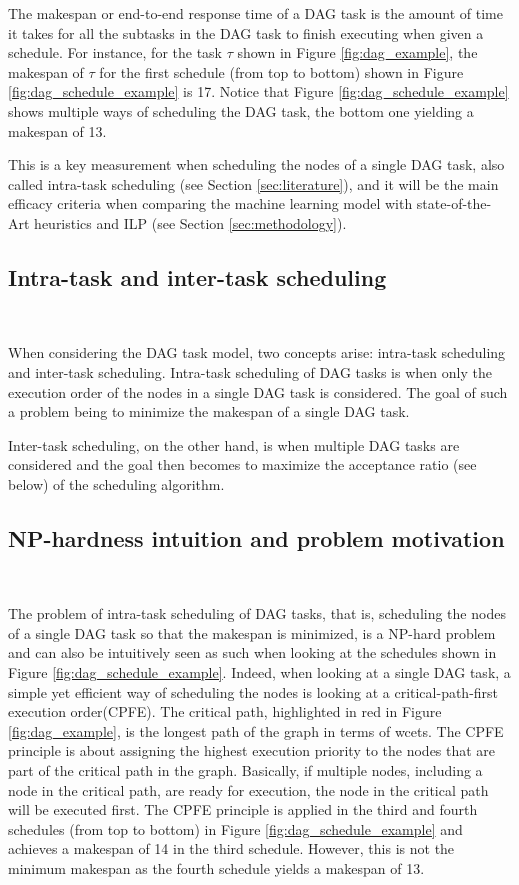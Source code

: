 The makespan or end-to-end response time of a 
DAG task is the amount of time it takes for all the subtasks
in the DAG task to finish executing when given a schedule.
For instance, for the task $\tau$ shown in Figure \ref{fig:dag_example},
the makespan of $\tau$ for the first schedule (from top to bottom) shown in Figure \ref{fig:dag_schedule_example}
is 17.
Notice that Figure \ref{fig:dag_schedule_example} shows multiple
ways of scheduling the DAG task, the bottom one yielding a makespan of 13.

This is a key measurement when scheduling the nodes of a single DAG task,
also called intra-task scheduling (see Section \ref{sec:literature}),
and it will be the main efficacy criteria when comparing 
the machine learning model with state-of-the-Art heuristics and ILP
(see Section \ref{sec:methodology}).

\subsection{Intra-task and inter-task scheduling}
~

When considering the DAG task model,
two concepts arise: intra-task scheduling and inter-task scheduling.
Intra-task scheduling of DAG tasks is when only the execution
order of the nodes in a single DAG task is considered.
The goal of such a problem being to minimize the makespan
of a single DAG task.

Inter-task scheduling, on the other hand, is when multiple DAG tasks
are considered and the goal then becomes to maximize the acceptance ratio (see below)
of the scheduling algorithm.

\subsection{NP-hardness intuition and problem motivation}
~

The problem of intra-task scheduling of DAG tasks,
that is, scheduling the nodes of a single DAG task so that 
the makespan is minimized,
is a NP-hard problem\cite{ULLMAN1975NPhard}\cite{du1989schedNPhard}
and can also be intuitively seen as such when looking at 
the schedules shown in Figure \ref{fig:dag_schedule_example}.
Indeed, 
when looking at a single DAG task,
a simple yet efficient way of scheduling the nodes 
is looking at a critical-path-first execution order(CPFE).
The critical path, highlighted in red in Figure \ref{fig:dag_example},
is the longest path of the graph in terms of wcets.
The CPFE principle is about assigning the highest execution priority
to the nodes that are part of the critical path in the graph.
Basically, if multiple nodes, including a node in the critical path, are ready for execution,
the node in the critical path will be executed first.
The CPFE principle is applied in the third and fourth schedules (from top to bottom)
in Figure \ref{fig:dag_schedule_example} and achieves a makespan of 14 in the third schedule.
However, this is not the minimum makespan as the fourth schedule yields a makespan
of 13.


